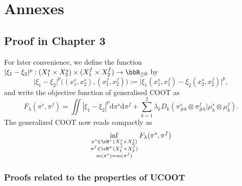 \chapter[Annexes]{Annexes}

\localtableofcontents



\section{Proof in Chapter 3}

For later convenience, we define the function
$\vert \xi_1 - \xi_2 \vert^p: (X_1^s \times X_2^s) \times (X_1^f \times X_2^f) \to \bbR_{\geq 0}$ by
\begin{equation*}
    \vert \xi_1 - \xi_2 \vert^p \big((x_1^s, x_2^s), (x_1^f, x_2^f)\big) :=
    \vert \xi_1(x_1^s, x_1^f) - \xi_2(x_2^s, x_2^f) \vert^p,
\end{equation*}
and write the objective function of generalised COOT as
\begin{equation*}
    F_{\lambda}(\pi^s, \pi^f) = \iint |\xi_1 - \xi_2|^p \mathrm d\pi^s \mathrm d \pi^f
    + \sum_{k=1}^2\lambda_k D_k(\pi^s_{\#k} \otimes \pi^f_{\#k} \vert \mu^s_k \otimes \mu^f_k).
\end{equation*}
The generalized COOT now reads compactly as
\begin{equation} \label{eq:ucoot_copy}
  \inf_{\substack{\pi^s \in \cM^+(X_1^s \times X_2^s) \\
  \pi^f \in \cM^+(X_1^f \times X_2^f) \\ m(\pi^s) = m(\pi^f)}} F_{\lambda}(\pi^s, \pi^f)
\end{equation}

\subsection{Proofs related to the properties of UCOOT}


